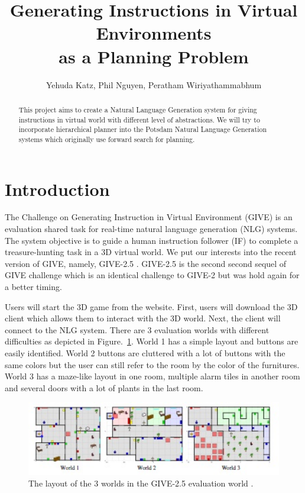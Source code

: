 \documentclass[11pt]{article} %
\title{Generating Instructions in Virtual Environments\\ as a Planning Problem}
\author{Yehuda Katz, Phil Nguyen, Peratham Wiriyathammabhum}
\begin{document}
\maketitle

\begin{abstract}
This project aims to create a Natural Language Generation system for giving instructions in virtual world with different level of abstractions. We will try to incorporate hierarchical planner into the Potsdam Natural Language Generation systems which originally use forward search for planning.
\end{abstract}

\section{Introduction}
The Challenge on Generating Instruction in Virtual Environment (GIVE) \cite{koller2010first} is an evaluation shared task for real-time natural language generation (NLG) systems. The system objective is to guide a human instruction follower (IF) to complete a treasure-hunting task in a 3D virtual world. We put our interests into the recent version of GIVE, namely, GIVE-2.5 \cite{striegnitz2011report}. GIVE-2.5 is the second second sequel of GIVE challenge which is an identical challenge to GIVE-2 \cite{koller2010report} but was hold again for a better timing.

Users will start the 3D game from the website. First, users will download the 3D client which allows them to interact with the 3D world. Next, the client will connect to the NLG system. There are 3 evaluation worlds with different difficulties as depicted in Figure.~\ref{fig:layout}. World 1 has a simple layout and buttons are easily identified. World 2 buttons are cluttered with a lot of buttons with the same colors but the user can still refer to the room by the color of the furnitures. World 3 has a maze-like layout in one room, multiple alarm tiles in another room and several doors with a lot of plants in the last room.

\begin{figure}[hbt!]
\centering
\includegraphics[width=120mm]{images/layout.jpg}
\caption{The layout of the 3 worlds in the GIVE-2.5 evaluation world \cite{striegnitz2011report}.\label{overflow}}
\label{fig:layout}
\end{figure}
\end{document}
